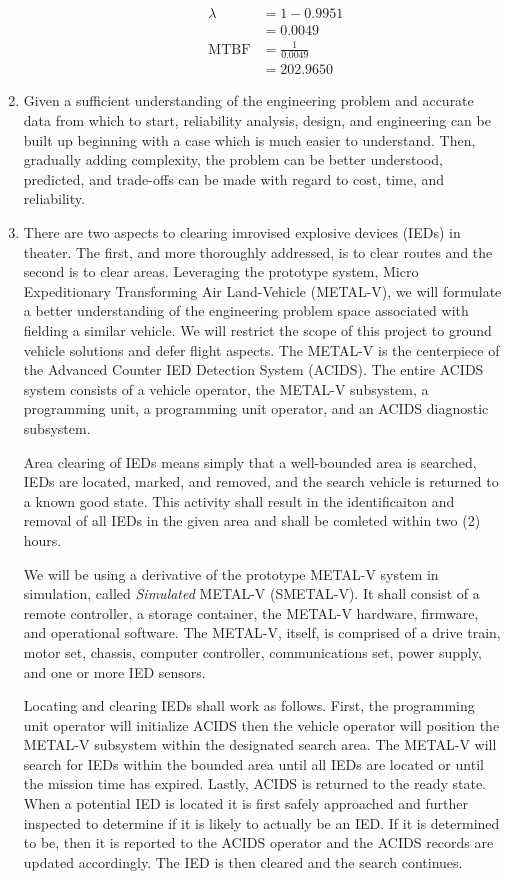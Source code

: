 \documentclass[letterpaper,10pt]{article}
\begin{document}
\begin{enumerate}
\begin{enumerate}
					\begin{align*}
						\lambda &= 1 - 0.9951 \\
						&= 0.0049 \\
						\mbox{MTBF} &= \frac{1}{0.0049} \\
						&= 202.9650
					\end{align*}
			\end{enumerate}
		\item Given a sufficient understanding of the engineering problem and accurate data from which to start, reliability analysis, design, and engineering can be built up beginning with a case which is much easier to understand.  Then, gradually adding complexity, the problem can be better understood, predicted, and trade-offs can be made with regard to cost, time, and reliability.
		\item 
			There are two aspects to clearing imrovised explosive devices (IEDs) in theater.  The first, and more thoroughly addressed, is to clear routes and the second is to clear areas.  Leveraging the prototype system, Micro Expeditionary Transforming Air Land-Vehicle (METAL-V), we will formulate a better understanding of the engineering problem space associated with fielding a similar vehicle.  We will restrict the scope of this project to ground vehicle solutions and defer flight aspects.  The METAL-V is the centerpiece of the Advanced Counter IED Detection System (ACIDS).  The entire ACIDS system consists of a vehicle operator, the METAL-V subsystem, a programming unit, a programming unit operator, and an ACIDS diagnostic subsystem.
			\par Area clearing of IEDs means simply that a well-bounded area is searched, IEDs are located, marked, and removed, and the search vehicle is returned to a known good state.  This activity shall result in the identificaiton and removal of all IEDs in the given area and shall be comleted within two (2) hours.
			\par We will be using a derivative of the prototype METAL-V system in simulation, called \emph{Simulated} METAL-V (SMETAL-V).  It shall consist of a remote controller, a storage container, the METAL-V hardware, firmware, and operational software.  The METAL-V, itself, is comprised of a drive train, motor set, chassis, computer controller, communications set, power supply, and one or more IED sensors.
			\par Locating and clearing IEDs shall work as follows.  First, the programming unit operator will initialize ACIDS then the vehicle operator will position the METAL-V subsystem within the designated search area.  The METAL-V will search for IEDs within the bounded area until all IEDs are located or until the mission time has expired.  Lastly, ACIDS is returned to the ready state.  When a potential IED is located it is first safely approached and further inspected to determine if it is likely to actually be an IED.  If it is determined to be, then it is reported to the ACIDS operator and the ACIDS records are updated accordingly.  The IED is then cleared and the search continues.

\end{enumerate}
\end{document}
